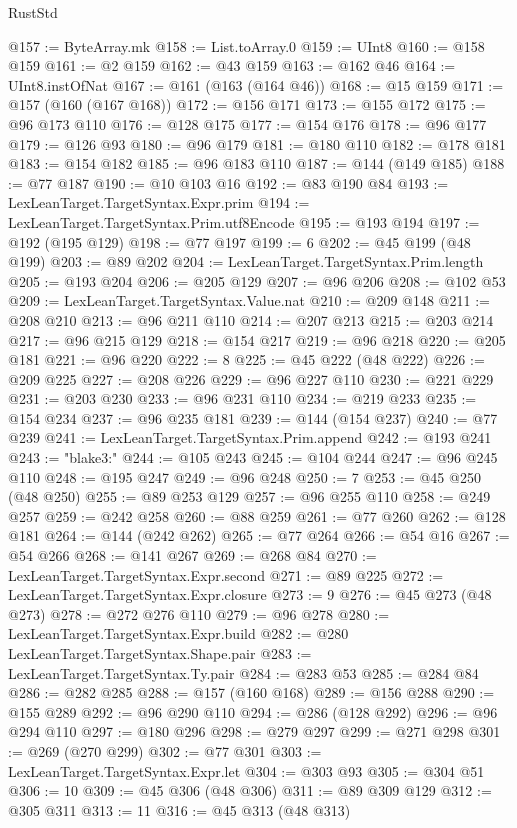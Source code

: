 \begin{lexlean}{RustStd}
\begin{coremodule}
{\begin{coremodule}
{{{{{{{{{{{{{{{{{{{{{{{{{{{{{{{{{{{{{{{{{{{{{{{{{{{{{{{{{{{{@157 := ByteArray.mk
@158 := List.toArray.{0}
@159 := UInt8
@160 := @158 @159
@161 := @2 @159
@162 := @43 @159
@163 := @162 @46
@164 := UInt8.instOfNat
@167 := @161 (@163 (@164 @46))
@168 := @15 @159
@171 := @157 (@160 (@167 @168))
@172 := @156 @171
@173 := @155 @172
@175 := @96 @173 @110
@176 := @128 @175
@177 := @154 @176
@178 := @96 @177
@179 := @126 @93
@180 := @96 @179
@181 := @180 @110
@182 := @178 @181
@183 := @154 @182
@185 := @96 @183 @110
@187 := @144 (@149 @185)
@188 := @77 @187
@190 := @10 @103 @16
@192 := @83 @190 @84
@193 := LexLeanTarget.TargetSyntax.Expr.prim
@194 := LexLeanTarget.TargetSyntax.Prim.utf8Encode
@195 := @193 @194
@197 := @192 (@195 @129)
@198 := @77 @197
@199 := 6
@202 := @45 @199 (@48 @199)
@203 := @89 @202
@204 := LexLeanTarget.TargetSyntax.Prim.length
@205 := @193 @204
@206 := @205 @129
@207 := @96 @206
@208 := @102 @53
@209 := LexLeanTarget.TargetSyntax.Value.nat
@210 := @209 @148
@211 := @208 @210
@213 := @96 @211 @110
@214 := @207 @213
@215 := @203 @214
@217 := @96 @215 @129
@218 := @154 @217
@219 := @96 @218
@220 := @205 @181
@221 := @96 @220
@222 := 8
@225 := @45 @222 (@48 @222)
@226 := @209 @225
@227 := @208 @226
@229 := @96 @227 @110
@230 := @221 @229
@231 := @203 @230
@233 := @96 @231 @110
@234 := @219 @233
@235 := @154 @234
@237 := @96 @235 @181
@239 := @144 (@154 @237)
@240 := @77 @239
@241 := LexLeanTarget.TargetSyntax.Prim.append
@242 := @193 @241
@243 := "blake3:"
@244 := @105 @243
@245 := @104 @244
@247 := @96 @245 @110
@248 := @195 @247
@249 := @96 @248
@250 := 7
@253 := @45 @250 (@48 @250)
@255 := @89 @253 @129
@257 := @96 @255 @110
@258 := @249 @257
@259 := @242 @258
@260 := @88 @259
@261 := @77 @260
@262 := @128 @181
@264 := @144 (@242 @262)
@265 := @77 @264
@266 := @54 @16
@267 := @54 @266
@268 := @141 @267
@269 := @268 @84
@270 := LexLeanTarget.TargetSyntax.Expr.second
@271 := @89 @225
@272 := LexLeanTarget.TargetSyntax.Expr.closure
@273 := 9
@276 := @45 @273 (@48 @273)
@278 := @272 @276 @110
@279 := @96 @278
@280 := LexLeanTarget.TargetSyntax.Expr.build
@282 := @280 LexLeanTarget.TargetSyntax.Shape.pair
@283 := LexLeanTarget.TargetSyntax.Ty.pair
@284 := @283 @53
@285 := @284 @84
@286 := @282 @285
@288 := @157 (@160 @168)
@289 := @156 @288
@290 := @155 @289
@292 := @96 @290 @110
@294 := @286 (@128 @292)
@296 := @96 @294 @110
@297 := @180 @296
@298 := @279 @297
@299 := @271 @298
@301 := @269 (@270 @299)
@302 := @77 @301
@303 := LexLeanTarget.TargetSyntax.Expr.let
@304 := @303 @93
@305 := @304 @51
@306 := 10
@309 := @45 @306 (@48 @306)
@311 := @89 @309 @129
@312 := @305 @311
@313 := 11
@316 := @45 @313 (@48 @313)
}}}}}}}}}}}}}}}}}}}}}}}}}}}}}}}}}}}}}}}}}}}}}}}}}}}}}}}}}}}}
\end{coremodule}}
\end{coremodule}
\end{lexlean}
